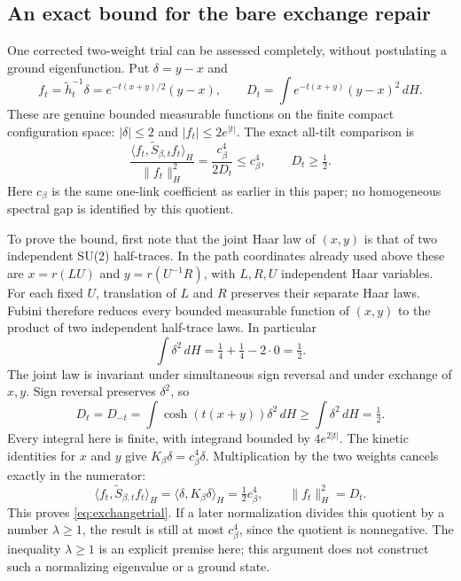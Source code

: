 \documentclass[11pt]{article}
\begin{document}
\subsection*{An exact bound for the bare exchange repair}
One corrected two-weight trial can be assessed completely, without
postulating a ground eigenfunction. Put $\delta=y-x$ and
\[
 f_t=\widetilde h_t^{-1}\delta
     =e^{-t(x+y)/2}(y-x),\qquad
 D_t=\int e^{-t(x+y)}(y-x)^2\,dH.
\]
These are genuine bounded measurable functions on the finite compact
configuration space: $|\delta|\leq2$ and $|f_t|\leq2e^{|t|}$.
The exact all-tilt comparison is
\begin{equation}\label{eq:exchangetrial}
 \frac{\langle f_t,\widetilde S_{\beta,t}f_t\rangle_H}
      {\|f_t\|_H^2}
 =\frac{c_\beta^4}{2D_t}\leq c_\beta^4,
 \qquad D_t\geq\tfrac12.
\end{equation}
Here $c_\beta$ is the same one-link coefficient as earlier in this
paper; no homogeneous spectral gap is identified by this quotient.

To prove the bound, first note that the joint Haar law of $(x,y)$
is that of two independent SU(2) half-traces. In the path coordinates
already used above these are $x=r(LU)$ and $y=r(U^{-1}R)$, with
$L,R,U$ independent Haar variables. For each fixed $U$, translation
of $L$ and $R$ preserves their separate Haar laws. Fubini therefore
reduces every bounded measurable function of $(x,y)$ to the product
of two independent half-trace laws. In particular
\[
 \int\delta^2\,dH=\tfrac14+\tfrac14-2\cdot0=\tfrac12.
\]
The joint law is invariant under simultaneous sign reversal and
under exchange of $x,y$. Sign reversal preserves $\delta^2$, so
\[
 D_t=D_{-t}
 =\int\cosh(t(x+y))\delta^2\,dH\geq\int\delta^2\,dH=\tfrac12.
\]
Every integral here is finite, with integrand bounded by $4e^{2|t|}$.
The kinetic identities for $x$ and $y$ give
$K_\beta\delta=c_\beta^4\delta$. Multiplication by the two
weights cancels exactly in the numerator:
\[
 \langle f_t,\widetilde S_{\beta,t}f_t\rangle_H
 =\langle\delta,K_\beta\delta\rangle_H
 =\tfrac12c_\beta^4,
 \qquad \|f_t\|_H^2=D_t.
\]
This proves \eqref{eq:exchangetrial}. If a later normalization divides
this quotient by a number $\lambda\geq1$, the result is still at most
$c_\beta^4$, since the quotient is nonnegative. The inequality
$\lambda\geq1$ is an explicit premise here; this argument does not
construct such a normalizing eigenvalue or a ground state.
\end{document}
